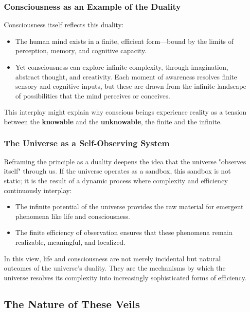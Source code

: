 \documentclass[12pt]{article}
\begin{document}
\subsubsection{Consciousness as an Example of the Duality}

Consciousness itself reflects this duality:
\begin{itemize}
    \item The human mind exists in a finite, efficient form—bound by the limits of perception, memory, and cognitive capacity.
    \item Yet consciousness can explore infinite complexity, through imagination, abstract thought, and creativity. Each moment of awareness resolves finite sensory and cognitive inputs, but these are drawn from the infinite landscape of possibilities that the mind perceives or conceives.
\end{itemize}

This interplay might explain why conscious beings experience reality as a tension between the \textbf{knowable} and the \textbf{unknowable}, the finite and the infinite.

\subsubsection{The Universe as a Self-Observing System}

Reframing the principle as a duality deepens the idea that the universe "observes itself" through us. If the universe operates as a sandbox, this sandbox is not static; it is the result of a dynamic process where complexity and efficiency continuously interplay:
\begin{itemize}
    \item The infinite potential of the universe provides the raw material for emergent phenomena like life and consciousness.
    \item The finite efficiency of observation ensures that these phenomena remain realizable, meaningful, and localized.
\end{itemize}

In this view, life and consciousness are not merely incidental but natural outcomes of the universe's duality. They are the mechanisms by which the universe resolves its complexity into increasingly sophisticated forms of efficiency.

\subsection{The Nature of These Veils}
\end{document}
